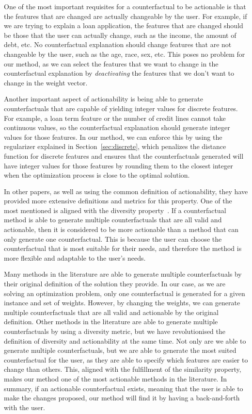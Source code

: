 \documentclass[12pt]{extarticle}
\numberwithin{equation}{section}
\begin{document}
One of the most important requisites for a counterfactual to be actionable is that the features that are changed are actually changeable by the user. For example, if we are trying to explain a loan application, the features that are changed should be those that the user can actually change, such as the income, the amount of debt, etc. No counterfactual explanation should change features that are not changeable by the user, such as the age, race, sex, etc. This poses no problem for our method, as we can select the features that we want to change in the counterfactual explanation by \emph{deactivating} the features that we don't want to change in the weight vector. 

Another important aspect of actionability is being able to generate counterfactuals that are capable of yielding integer values for discrete features. For example, a loan term feature or the number of credit lines cannot take continuous values, so the counterfactual explanation should generate integer values for those features. In our method, we can enforce this by using the regularizer explained in Section~\ref{sec:discrete}, which penalizes the distance function for discrete features and ensures that the counterfactuals generated will have integer values for those features by rounding them to the closest integer when the optimization process is close to the optimal solution.

In other papers, as well as using the common definition of actionability, they have provided more extensive definitions and metrics for this property. One of the most mentioned is aligned with the diversity property~\cite{dice}. If a counterfactual method is able to generate multiple counterfactuals that are all valid and actionable, then it is considered to be more actionable than a method that can only generate one counterfactual. This is because the user can choose the counterfactual that is most suitable for their needs, and therefore the method is more flexible and adaptable to the user's needs. 

Many methods in the literature are able to generate multiple counterfactuals by their original definition of the solution they provide. In our case, as we are solving an optimization problem, only one counterfactual is generated for a given instance and set of weights. However, by changing the weights, we can generate multiple counterfactuals that are all valid and actionable by the original definition. Other methods in the literature are able to generate multiple counterfactuals by using a diversity metric, but we have revolutionised the definition of diversity and actionability at the same time. Not only are we able to generate multiple counterfactuals, but we are able to generate the most suited counterfactual for the user, as they are able to specify which features are easier to change than others. This, aligned with the fulfillment of the similarity property, makes our method one of the most actionable methods in the literature. In summary, if an actionable counterfactual exists, meaning that the user is able to make the changes proposed, our method will find it by having a back-and-forth with the user.
\end{document}

